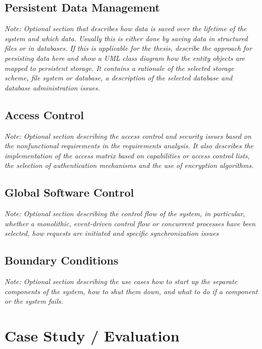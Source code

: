 \documentclass[a4paper,12pt,twoside]{report}
\begin{document}
\section{Persistent Data Management}

\textit{Note: Optional section that describes how data is saved over the lifetime of the system and which data. Usually this is either done by saving data in structured files or in databases. If this is applicable for the thesis, describe the approach for persisting data here and show a UML class diagram how the entity objects are mapped to persistent storage.
It contains a rationale of the selected storage scheme, file system or database, a description of the selected database and database administration issues.}

\section{Access Control}

\textit{Note: Optional section describing the access control and security issues based on the nonfunctional requirements in the requirements analysis. It also describes the implementation of the access matrix based on capabilities or access control lists, the selection of  authentication mechanisms and the use of encryption algorithms.}

\section{Global Software Control}

\textit{Note: Optional section describing the control flow of the system, in particular, whether a monolithic, event-driven control flow or concurrent processes have been selected, how requests are initiated and specific synchronization issues}


\section{Boundary Conditions}

\textit{Note: Optional section describing the use cases how to start up the separate components of the system, how to shut them down, and what to do if a component or the system fails.}






\chapter{Case Study / Evaluation}
\end{document}
